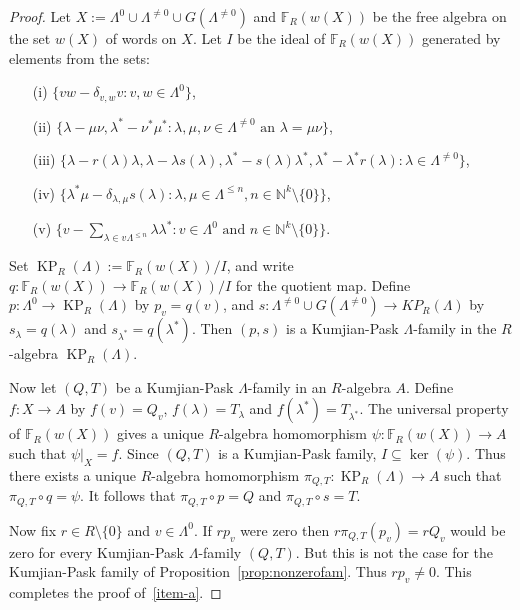\documentclass[a4paper,12pt]{amsart}
\numberwithin{equation}{section}
\theoremstyle{definition}
\theoremstyle{remark}
\begin{document}
\begin{proof}
Let $X:=\Lambda^0 \cup \Lambda^{\neq 0} \cup G(\Lambda^{\neq 0})$ and ${\mathbb{F}}_R(w(X))$ be the free algebra 
on the set $w(X)$ of words on $X$. Let $I$ be the ideal of ${\mathbb{F}}_R(w(X))$ generated by elements from the sets:
\begin{enumerate}
\item[(i)] $\{vw-\delta_{v,w}v: v,w \in \Lambda^0\}$,
\item[(ii)] $\{\lambda-\mu\nu, \lambda^{*} -\nu^{*}\mu^{*}: \lambda,\mu,\nu \in \Lambda^{\neq 0}
\text{ an } \lambda = \mu\nu\}$,
\item[(iii)] $\{\lambda-r(\lambda)\lambda ,\lambda - \lambda s(\lambda),
\lambda^{*}-s(\lambda)\lambda^{*},\lambda^{*}-\lambda^{*}r(\lambda)
:\lambda \in \Lambda^{\neq 0}\}$,
\item[(iv)] $\{\lambda^{*}\mu-\delta_{\lambda,\mu}s(\lambda):
\lambda, \mu \in \Lambda^{\leq n}, n \in {\mathbb{N}}^k \setminus \{0\}\}$,
\item[(v)] $\{v-\sum_{\lambda \in v\Lambda^{\leq n}} \lambda \lambda^{*}: 
v \in \Lambda^0 \text{ and }n \in {\mathbb{N}}^k \setminus \{0\}\}$.
\end{enumerate}
Set $\operatorname{KP}_R(\Lambda):={\mathbb{F}}_R(w(X))/I$, and write $q: {\mathbb{F}}_R(w(X))\to {\mathbb{F}}_R(w(X))/I$ for the quotient map. Define $p:\Lambda^0 \to \operatorname{KP}_R(\Lambda)$ by $p_v=q(v)$, and  
$s: \Lambda^{\neq 0} \cup G(\Lambda^{\neq 0}) \to KP_R(\Lambda)$ by 
$s_\lambda=q(\lambda)$ and $s_{\lambda^{*}}=q(\lambda^{*})$. 
Then $(p,s)$ is a Kumjian-Pask $\Lambda$-family in the $R$-algebra $\operatorname{KP}_R(\Lambda)$. 

Now let $(Q,T)$ be a Kumjian-Pask $\Lambda$-family in an $R$-algebra $A$. 
Define $f:X \to A$ by $f(v)=Q_v$, $f(\lambda)=T_\lambda$ and $f(\lambda^{*})=T_{\lambda^{*}}$. 
The universal property of ${\mathbb{F}}_R(w(X))$  gives a unique $R$-algebra homomorphism $\psi: {\mathbb{F}}_R(w(X)) \to A$ such 
that $\psi|_X=f$. Since $(Q,T)$ is a Kumjian-Pask family,  $I \subseteq \ker(\psi)$. Thus there exists a unique  
$R$-algebra homomorphism $\pi_{Q,T}:\operatorname{KP}_R(\Lambda) \to A$  such that $\pi_{Q,T}\circ q=\psi$. It follows that 
$\pi_{Q,T} \circ p=Q$ and $\pi_{Q,T} \circ s=T$. 

Now fix $r \in R\setminus\{0\}$ and $v\in\Lambda^0$. If  $rp_v$ were zero then $r\pi_{Q,T}(p_v)=rQ_v$ would be 
zero for every Kumjian-Pask $\Lambda$-family $(Q,T)$.  But this is not the case for the Kumjian-Pask family of Proposition~\ref{prop:nonzerofam}.  
Thus $rp_v\neq 0$. This completes the proof of~\eqref{item-a}.


\end{proof}
\end{document}
